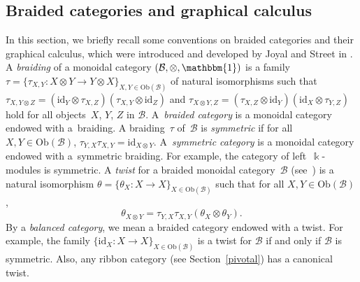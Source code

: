 \documentclass[10pt,a4paper]{amsart}
\numberwithin{equation}{section}
\newcommand{\co}{\colon}
\newcommand{\tens}{\otimes}
\newcommand{\id}{\mathrm{id}}
\newcommand{\mc}{\mathcal}
\newcommand{\Ob}[1]{\mathrm{Ob}(#1)}
\newcommand{\kk}{\Bbbk}
\newcommand{\uu}{\mathbbm{1}}
\begin{document}
\subsection{Braided categories and graphical calculus} \label{braidedcats}

In this section, we briefly recall some conventions on braided categories and their graphical calculus, which were introduced and developed by Joyal and Street in \cite{joyal1985braided, joyal1986braided, joyal1991geometry}.
A \textit{braiding} of a monoidal category $(\mc B, \tens, \uu)$ is a family~$\tau=\{\tau_{X,Y}\co X\tens Y \to Y\tens X\}_{X,Y\in \Ob{\mc B}}$ of natural isomorphisms such that $\tau_{X,Y\tens Z}= (\id_Y \tens \tau_{X,Z})(\tau_{X,Y} \tens \id_Z)$ and $\tau_{X\tens Y, Z}= (\tau_{X,Z} \tens \id_Y)(\id_X \tens \tau_{Y,Z})$ hold for all objects~$X$, $Y$, $Z$ in $\mc B$.
A~\textit{braided category} is a monoidal category endowed with a~braiding. A braiding~$\tau$ of~$\mc B$ is \textit{symmetric} if for all~$X,Y \in \Ob{\mc B}$, $\tau_{Y,X}\tau_{X,Y}=\id_{X\tens Y}$.
A~\textit{symmetric category} is a monoidal category endowed with a~symmetric braiding. For example, the category of left~$\kk$-modules is symmetric.
A \textit{twist} for a braided monoidal category~$\mc B$ (see~\cite{shum1994tortile}) is a natural isomorphism $\theta=\{\theta_X \co X \to X\}_{X \in \Ob{\mc B}}$ such that for all $X,Y \in \Ob{\mc B}$,
\begin{equation*} %
\theta_{X\tens Y}= \tau_{Y,X}\tau_{X,Y} (\theta_X \tens \theta_Y).
\end{equation*}
By a \textit{balanced category}, we mean a braided category endowed with a twist. For example, the family $\{\id_X\co X \to X\}_{X\in \Ob{\mc B}}$ is a twist for $\mc B$ if and only if $\mc B$ is symmetric. Also, any ribbon category (see Section~\ref{pivotal}) has a canonical twist.
\end{document}
